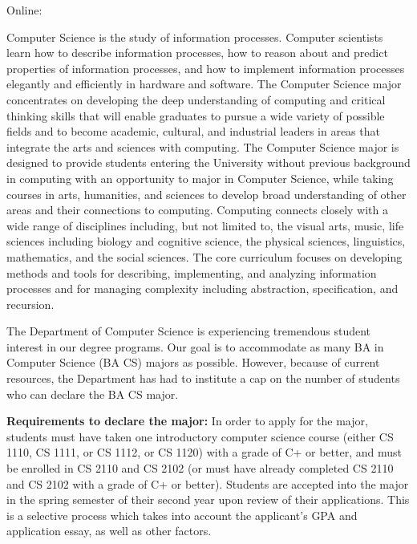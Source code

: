 \noindent Online: \bacsURL


Computer Science is the study of information processes. Computer
scientists learn how to describe information processes, how to reason
about and predict properties of information processes, and how to
implement information processes elegantly and efficiently in hardware
and software. The Computer Science major concentrates on developing
the deep understanding of computing and critical thinking skills that
will enable graduates to pursue a wide variety of possible fields and
to become academic, cultural, and industrial leaders in areas that
integrate the arts and sciences with computing. The Computer Science
major is designed to provide students entering the University without
previous background in computing with an opportunity to major in
Computer Science, while taking courses in arts, humanities, and
sciences to develop broad understanding of other areas and their
connections to computing. Computing connects closely with a wide range
of disciplines including, but not limited to, the visual arts, music,
life sciences including biology and cognitive science, the physical
sciences, linguistics, mathematics, and the social sciences. The core
curriculum focuses on developing methods and tools for describing,
implementing, and analyzing information processes and for managing
complexity including abstraction, specification, and recursion. 


\label{bacsapplicationprocess}

The Department of Computer Science is experiencing tremendous student
interest in our degree programs. Our goal is to accommodate as many BA
in Computer Science (BA CS) majors as possible.  However, because of
current resources, the Department has had to institute a cap on the
number of students who can declare the BA CS major.


{\bf Requirements to declare the major:} In order to apply for the
major, students must have taken one introductory computer science
course (either CS 1110, CS 1111, or CS 1112, or CS 1120) with a grade
of C+ or better, and must be enrolled in CS 2110 and CS 2102 (or must
have already completed CS 2110 and CS 2102 with a grade of C+ or
better). Students are accepted into the major in the spring semester
of their second year upon review of their applications. This is a
selective process which takes into account the applicant's GPA and
application essay, as well as other factors.

